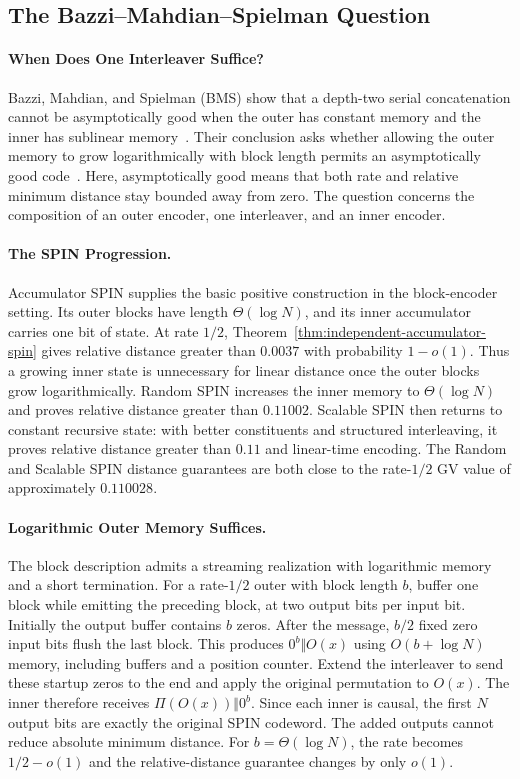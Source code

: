 \subsection{The Bazzi--Mahdian--Spielman Question}
\label{sec:bms-question}

\paragraph{When Does One Interleaver Suffice?}
Bazzi, Mahdian, and Spielman (BMS) show that a depth-two serial concatenation
cannot be asymptotically good when the outer has constant memory and the
inner has sublinear memory~\cite[Sec.~III-A]{bms09}. Their conclusion asks
whether allowing the outer memory to grow logarithmically with block length
permits an asymptotically good code~\cite[Sec.~IV]{bms09}.
Here, asymptotically good means that both rate and relative minimum
distance stay bounded away from zero. The question concerns the
composition of an outer encoder, one interleaver, and an inner encoder.

\paragraph{The SPIN Progression.}
Accumulator SPIN supplies the basic positive construction in the
block-encoder setting. Its outer blocks have length $\Theta(\log N)$,
and its inner accumulator carries one bit of state. At rate $1/2$,
Theorem~\ref{thm:independent-accumulator-spin} gives relative distance
greater than $0.0037$ with probability $1-o(1)$. Thus a growing inner
state is unnecessary for linear distance once the outer blocks grow
logarithmically. Random SPIN increases the inner memory to
$\Theta(\log N)$ and proves relative distance greater than $0.11002$.
Scalable SPIN then returns to constant recursive state: with better
constituents and structured interleaving, it proves relative distance
greater than $0.11$ and linear-time encoding. The Random and Scalable SPIN distance
guarantees are both close to the rate-$1/2$ GV value of approximately $0.110028$.

\paragraph{Logarithmic Outer Memory Suffices.}
The block description admits a streaming realization with logarithmic
memory and a short termination. For a rate-$1/2$ outer with block length
$b$, buffer one block while emitting the preceding block, at two output
bits per input bit. Initially the output buffer contains $b$ zeros.
After the message, $b/2$ fixed zero input bits flush the last block.
This produces $0^b\Vert O(x)$ using $O(b+\log N)$ memory, including
buffers and a position counter. Extend the interleaver to send these
startup zeros to the end and apply the original permutation to $O(x)$.
The inner therefore receives $\Pi(O(x))\Vert0^b$. Since each inner is
causal, the first $N$ output bits are exactly the original SPIN codeword.
The added outputs cannot reduce absolute minimum distance. For
$b=\Theta(\log N)$, the rate becomes $1/2-o(1)$ and the relative-distance
guarantee changes by only $o(1)$.

